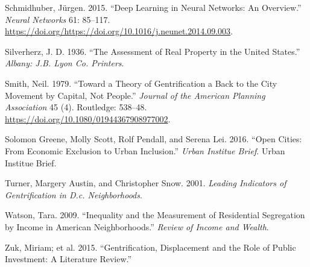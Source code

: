 \documentclass[12pt,]{article}
\begin{document}
\leavevmode\hypertarget{ref-SCHMIDHUBER201585}{}%
Schmidhuber, Jürgen. 2015. ``Deep Learning in Neural Networks: An
Overview.'' \emph{Neural Networks} 61: 85--117.
\url{https://doi.org/https://doi.org/10.1016/j.neunet.2014.09.003}.

\leavevmode\hypertarget{ref-Silverherz1936}{}%
Silverherz, J. D. 1936. ``The Assessment of Real Property in the United
States.'' \emph{Albany: J.B. Lyon Co. Printers}.

\leavevmode\hypertarget{ref-Smith1979}{}%
Smith, Neil. 1979. ``Toward a Theory of Gentrification a Back to the
City Movement by Capital, Not People.'' \emph{Journal of the American
Planning Association} 45 (4). Routledge: 538--48.
\url{https://doi.org/10.1080/01944367908977002}.

\leavevmode\hypertarget{ref-urban2016}{}%
Solomon Greene, Molly Scott, Rolf Pendall, and Serena Lei. 2016. ``Open
Cities: From Economic Exclusion to Urban Inclusion.'' \emph{Urban
Institue Brief}. Urban Institue Brief.

\leavevmode\hypertarget{ref-Turner2001}{}%
Turner, Margery Austin, and Christopher Snow. 2001. \emph{Leading
Indicators of Gentrification in D.c. Neighborhoods}.

\leavevmode\hypertarget{ref-Watson2009}{}%
Watson, Tara. 2009. ``Inequality and the Measurement of Residential
Segregation by Income in American Neighborhoods.'' \emph{Review of
Income and Wealth}.

\leavevmode\hypertarget{ref-Zuk2015}{}%
Zuk, Miriam; et al. 2015. ``Gentrification, Displacement and the Role of
Public Investment: A Literature Review.''
\end{document}
